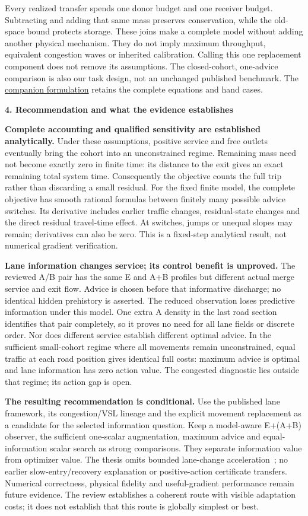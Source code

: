 \documentclass[10pt,a4paper]{article}
\newcommand{\head}[1]{\par\vspace{5pt}\noindent\textbf{#1}\par\nobreak\vspace{1pt}}
\begin{document}
Every realized transfer spends one donor budget and one receiver budget.
Subtracting and adding that same mass preserves conservation, while the
old-space bound protects storage. These joins make a complete model without
adding another physical mechanism. They do not imply maximum throughput,
equivalent congestion waves or inherited calibration. Calling this one
replacement component does not remove its assumptions. The closed-cohort,
one-advice comparison is also our task design, not an unchanged published
benchmark. The \href{vsl_joined_candidate_contract_and_qualification.pdf}{companion formulation}
retains the complete equations and hand cases.

\head{4. Recommendation and what the evidence establishes}
\textbf{Complete accounting and qualified sensitivity are established
analytically.} Under these assumptions, positive service and free outlets
eventually bring the cohort into an unconstrained regime. Remaining mass
need not become exactly zero in finite time: its distance to the exit gives
an exact remaining total system time. Consequently the objective counts
the full trip rather than discarding a small residual. For the fixed finite
model, the complete objective has smooth rational formulas between finitely
many possible advice switches. Its derivative includes earlier traffic
changes, residual-state changes and the direct residual travel-time effect.
At switches, jumps or unequal slopes may remain; derivatives can also be zero.
This is a fixed-step analytical result, not numerical gradient verification.

\textbf{Lane information changes service; its control benefit is unproved.}
The reviewed A/B pair has the same E and A+B profiles but different actual
merge service and exit flow. Advice is chosen before that informative
discharge; no identical hidden prehistory is asserted. The reduced observation loses predictive
information under this model. One extra A density in the last road section
identifies that pair completely, so it proves no need for all lane fields
or discrete order. Nor does different service establish different optimal
advice. In the sufficient small-cohort regime where all movements remain
unconstrained, equal traffic at each road position gives identical full
costs: maximum advice is optimal and lane information has zero action value.
The congested diagnostic lies outside that regime; its action gap is open.

\textbf{The resulting recommendation is conditional.}
Use the published lane framework, its congestion/VSL lineage and the explicit
movement replacement as a candidate for the selected information question.
Keep a model-aware E+(A+B) observer, the sufficient one-scalar augmentation,
maximum advice and equal-information scalar search as strong comparisons.
They separate information value from optimizer value. The thesis omits
bounded lane-change acceleration~\cite{thesis}; no earlier slow-entry/recovery
explanation or positive-action certificate transfers. Numerical correctness,
physical fidelity and useful-gradient performance remain future evidence.
The review establishes a coherent route with visible adaptation costs;
it does not establish that this route is globally simplest or best.
\end{document}
